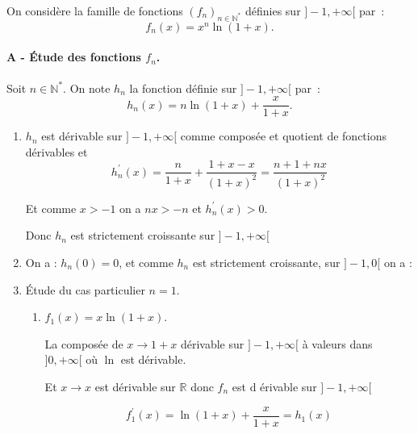 \begin{correction}
On consid\`ere la famille de fonctions $(f_n)_{n\in\mathbb{N}^*}$ d\'efinies
sur $]-1,+\infty[$ par~: 
\begin{equation*}
f_n(x)=x^n\ln (1+x).
\end{equation*}

\paragraph{A - \'Etude des fonctions $f_n$.}

Soit $n\in \mathbb{N}^{*}$. On note $h_{n}$ la fonction d\'{e}finie sur $%
]-1,+\infty [$ par~: 
\begin{equation*}
h_{n}(x)=n\ln (1+x)+\frac{x}{1+x}.
\end{equation*}

\begin{enumerate}
\item $h_{n}$ est d\'{e}rivable sur $]-1,+\infty [$ comme compos\'{e}e et
quotient de fonctions d\'{e}rivables et 
\begin{equation*}
h_{n}^{\prime }\left( x\right) =\frac{n}{1+x}+\frac{1+x-x}{\left( 1+x\right)
^{2}}=\frac{n+1+nx}{\left( 1+x\right) ^{2}}
\end{equation*}

Et comme $x>-1$ on a $nx>-n$ et $h_{n}^{\prime }\left( x\right) >0.$

Donc $h_{n}$ est strictement croissante sur $]-1,+\infty [$

\item On a : $h_{n}(0)=0$, et comme $h_{n}$ est strictement croissante, sur $%
]-1,0[$ on a :

\fbox{$h_{n}<0$ sur $]-1,0[$ et sur $]0,+\infty [$ on a $h_{n}>0$}

\item \'{E}tude du cas particulier $n=1$.

\begin{enumerate}
\item $f_{1}(x)=x\ln (1+x).$

La compos\'{e}e de $x\rightarrow 1+x$ d\'{e}rivable sur $]-1,+\infty [$ \`{a}
valeurs dans $]0,+\infty [$ o\`{u} $\ln $ est d\'{e}rivable.

Et $x\rightarrow x$ est d\'{e}rivable sur $\mathbb{R}$ donc $f_{n}$ est d%
\'{e}rivable sur $]-1,+\infty [$

\begin{equation*}
f_{1}^{\prime }(x)=\ln \left( 1+x\right) +\frac{x}{1+x}=h_{1}\left( x\right)
\end{equation*}


\end{enumerate}
\end{enumerate}
\end{correction}
